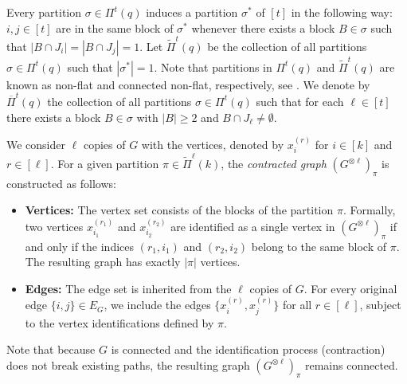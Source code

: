 \documentclass{article}
\theoremstyle{definition}
\numberwithin{equation}{section}
\theoremstyle{remark}
\newcommand{\R}{\mathbb{R}}
\begin{document}
Every partition $\sigma\in\Pi^t(q)$ induces a partition $\sigma^*$ of $[t]$ in the following way: $i,j\in[t]$ are in the same block of $\sigma^*$ whenever there exists a block $B\in\sigma$ such that $|B\cap J_i|=|B\cap J_j|=1$. Let $\widetilde{\Pi}^t(q)$ be the collection of all partitions $\sigma\in\Pi^t(q)$ such that $|\sigma^*|=1$. Note that partitions in $\Pi^t(q)$ and $\widetilde{\Pi}^t(q)$ are known as non-flat and connected non-flat, respectively, see \cite[Chapter~4]{peccati2011}. 
We denote by $\overline{\Pi}^t(q)$ the collection of all partitions $\sigma\in\Pi^t(q)$ such that for each $\ell\in[t]$ there exists a block $B\in\sigma$ with $|B|\ge2$ and $B\cap J_\ell\ne\emptyset$.


We consider $\ell$ copies of $G$ with the vertices, denoted by $x_i^{(r)}$ for $i\in[k]$ and $r\in[\ell]$. For a given partition $\pi \in \widetilde{\Pi}^\ell(k)$, the {\it contracted graph} $(G^{\otimes \ell})_{\pi}$ is constructed as follows:
\begin{itemize}
    \item \textbf{Vertices:} The vertex set consists of the blocks of the partition $\pi$. Formally, two vertices $x_{i_1}^{(r_1)}$ and $x_{i_2}^{(r_2)}$ are identified as a single vertex in $(G^{\otimes \ell})_{\pi}$ if and only if the indices $(r_1, i_1)$ and $(r_2, i_2)$ belong to the same block of $\pi$. The resulting graph has exactly $|\pi|$ vertices.
    
    \item \textbf{Edges:} The edge set is inherited from the $\ell$ copies of $G$. For every original edge $\{i, j\} \in E_G$, we include the edges $\{x_i^{(r)}, x_j^{(r)}\}$ for all $r \in [\ell]$, subject to the vertex identifications defined by $\pi$.
\end{itemize}
Note that because $G$ is connected and the identification process (contraction) does not break existing paths, the resulting graph $(G^{\otimes \ell})_{\pi}$ remains connected.
\end{document}
